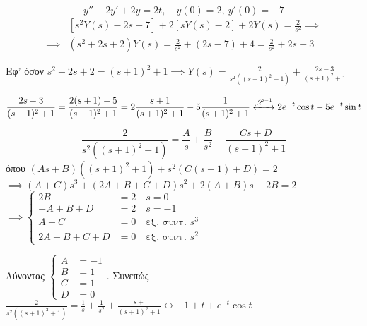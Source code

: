 \documentclass[11pt,a4paper,titlepage,final]{article}
\begin{document}
\begin{exercise*}{12.9}
	\[
	y''-2y'+2y=2t,\quad y(0) = 2, \ y'(0) = -7
	\]
	\tcblower
	\begin{align*}
	& \left[s^2Y(s)-2s+7\right]+2\left[sY(s)-2\right]+2Y(s) = \frac{2}{s^2} \implies \\
	\implies & (s^2+2s+2)Y(s) = \frac{2}{s^2}+(2s-7)+4=\frac{2}{s^2}+2s -3
	\end{align*}
	
	Εφ' όσον \( s^2+2s+2 =(s+1)^2+1 \implies Y(s) = \frac{2}{s^2\left((s+1)^2+1\right)}
	+\frac{2s-3}{(s+1)^2+1}
	\)
	
	\[
	\frac{2s-3}{(s+1)^2+1} = \frac{2(s+1)-5}{(s+1)^2+1}=2\frac{s+1}{(s+1)^2+1}-5\frac{1}{(s+1)^2+1}
	\xleftrightarrow{\mathscr L^{-1}}2e^{-t}\cos t-5e^{-t}\sin t
	\]
	
	\[
	\frac{2}{s^2\left((s+1)^2+1\right)} = \frac{A}{s} + \frac{B}{s^2} + \frac{Cs+D}{(s+1)^2+1}
	\]
	όπου \( (As+B)\left((s+1)^2+1\right) + s^2\left(C(s+1)+D\right) =2 \) \\
	\( \implies (A+C)s^3+(2A+B+C+D)s^2 + 2(A+B)s+2B = 2 \) \\
	\( \implies \begin{cases}
	2B&= 2 \quad s = 0\\
	-A+B+D &= 2 \quad s = -1 \\
	A+C &= 0 \quad \text{εξ. συντ. } s^3 \\
	2A+B+C+D &=0 \quad \text{εξ. συντ. } s^2
	\end{cases} \)
	
	Λύνοντας \( 
	\begin{cases}
	A &= -1 \\ B &= 1 \\ C &= 1 \\ D &= 0
	\end{cases}
	 \). Συνεπώς \( \frac{2}{s^2\left((s+1)^2+1\right)} = \frac{1}{s}+\frac{1}{s^2}+ \frac{s+}{(s+1)^2+1} 
	 \leftrightarrow -1+t+e^{-t}\cos t
	 \)
\end{exercise*}
\end{document}
